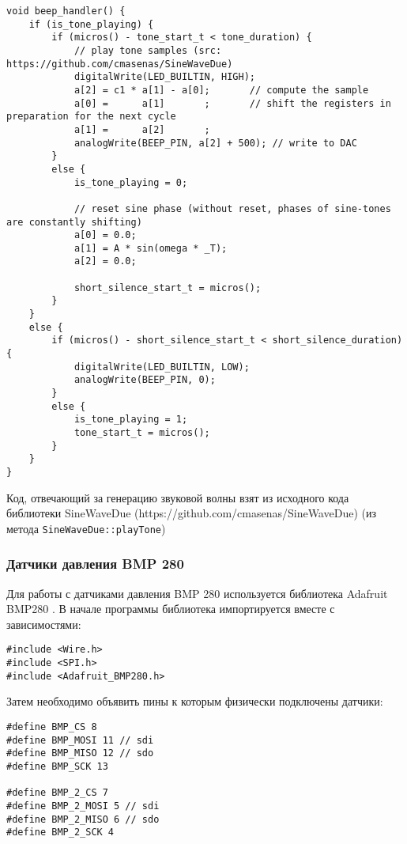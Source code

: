 \documentclass[../main.tex]{subfiles}
\begin{document}
\begin{lstlisting}
void beep_handler() {
    if (is_tone_playing) {
        if (micros() - tone_start_t < tone_duration) {
            // play tone samples (src: https://github.com/cmasenas/SineWaveDue)
            digitalWrite(LED_BUILTIN, HIGH);
            a[2] = c1 * a[1] - a[0];       // compute the sample
            a[0] =      a[1]       ;       // shift the registers in preparation for the next cycle
            a[1] =      a[2]       ;
            analogWrite(BEEP_PIN, a[2] + 500); // write to DAC
        }
        else {
            is_tone_playing = 0;

            // reset sine phase (without reset, phases of sine-tones are constantly shifting)
            a[0] = 0.0;
            a[1] = A * sin(omega * _T);
            a[2] = 0.0;

            short_silence_start_t = micros();
        }
    }
    else {
        if (micros() - short_silence_start_t < short_silence_duration) {
            digitalWrite(LED_BUILTIN, LOW);
            analogWrite(BEEP_PIN, 0);
        }
        else {
            is_tone_playing = 1;
            tone_start_t = micros();
        }
    }
}
\end{lstlisting}


Код, отвечающий за генерацию звуковой волны взят из исходного кода библиотеки SineWaveDue (https://github.com/cmasenas/SineWaveDue) (из метода \texttt{SineWaveDue::playTone})

\subsubsection{Датчики давления BMP 280}
Для работы с датчиками давления BMP 280 используется библиотека 
Adafruit BMP280 \cite{BMP280Library}. В начале программы библиотека импортируется вместе с зависимостями:

\begin{lstlisting}
#include <Wire.h>
#include <SPI.h>
#include <Adafruit_BMP280.h>
\end{lstlisting}

Затем необходимо объявить пины к которым физически подключены датчики: 

\begin{lstlisting}
#define BMP_CS 8
#define BMP_MOSI 11 // sdi
#define BMP_MISO 12 // sdo
#define BMP_SCK 13

#define BMP_2_CS 7
#define BMP_2_MOSI 5 // sdi
#define BMP_2_MISO 6 // sdo
#define BMP_2_SCK 4
\end{lstlisting}
\end{document}
